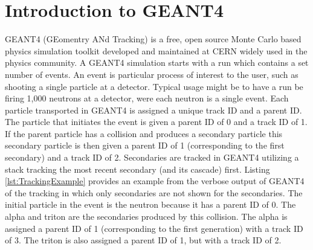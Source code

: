 \section{Introduction to GEANT4}
\label{sec:G4Intro}

GEANT4 (GEomentry ANd Tracking) is a free, open source Monte Carlo based physics simulation toolkit developed and maintained at CERN widely used in the physics community.
A GEANT4 simulation starts with a run which contains a set number of events.
An event is particular process of interest to the user, such as shooting a single particle at a detector. 
Typical usage might be to have a run be firing 1,000 neutrons at a detector, were each neutron is a single event.
Each particle transported in GEANT4 is assigned a unique track ID and a parent ID.
The particle that initiates the event is given a parent ID of 0 and a track ID of 1.
If the parent particle has a collision and produces a secondary particle this secondary particle is then given a parent ID of 1 (corresponding to the first secondary) and a track ID of 2.
Secondaries are tracked in GEANT4 utilizing a stack tracking the most recent secondary (and its cascade) first.
Listing \ref{lst:TrackingExample} provides an example from the verbose output of GEANT4 of the tracking in which only secondaries are not shown for the secondaries.
The initial particle in the event is the neutron because it has a parent ID of 0.
The alpha and triton are the secondaries produced by this collision. 
The alpha is assigned a parent ID of 1 (corresponding to the first generation) with a track ID of 3.
The triton is also assigned a parent ID of 1, but with a track ID of 2.
